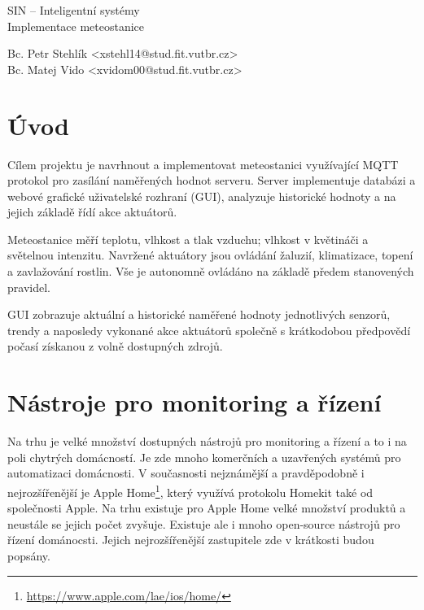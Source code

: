 \documentclass[11pt,a4paper]{article}
\begin{document}
\begin{center}
	\LARGE{SIN -- Inteligentní systémy}\\
	\Large{Implementace meteostanice}
	\vspace{0.5cm}

    \begin{centering}
    \small{
        Bc. Petr Stehlík <xstehl14@stud.fit.vutbr.cz>\\Bc. Matej Vido <xvidom00@stud.fit.vutbr.cz>
        }
    \end{centering}

	\vspace{0.2cm}

\end{center}

\section{Úvod}
Cílem projektu je navrhnout a implementovat meteostanici využívající MQTT protokol pro zasílání naměřených hodnot serveru. Server implementuje databázi a webové grafické uživatelské rozhraní (GUI), analyzuje historické hodnoty a na jejich základě řídí akce aktuátorů.

Meteostanice měří teplotu, vlhkost a tlak vzduchu; vlhkost v květináči a světelnou intenzitu. Navržené aktuátory jsou ovládání žaluzií, klimatizace, topení a zavlažování rostlin. Vše je autonomně ovládáno na základě předem stanovených pravidel.

GUI zobrazuje aktuální a historické naměřené hodnoty jednotlivých senzorů, trendy a naposledy vykonané akce aktuátorů společně s krátkodobou předpovědí počasí získanou z volně dostupných zdrojů.

\section{Nástroje pro monitoring a řízení}
Na trhu je velké množství dostupných nástrojů pro monitoring a řízení a to i na poli chytrých domácností. Je zde mnoho komerčních a uzavřených systémů pro automatizaci domácnosti. V současnosti nejznámější a pravděpodobně i nejrozšířenější je Apple Home\footnote{\url{https://www.apple.com/lae/ios/home/}}, který využívá protokolu Homekit také od společnosti Apple. Na trhu existuje pro Apple Home velké množství produktů a neustále se jejich počet zvyšuje. Existuje ale i mnoho open-source nástrojů pro řízení dománocsti. Jejich nejrozšířenější zastupitele zde v krátkosti budou popsány.
\end{document}
